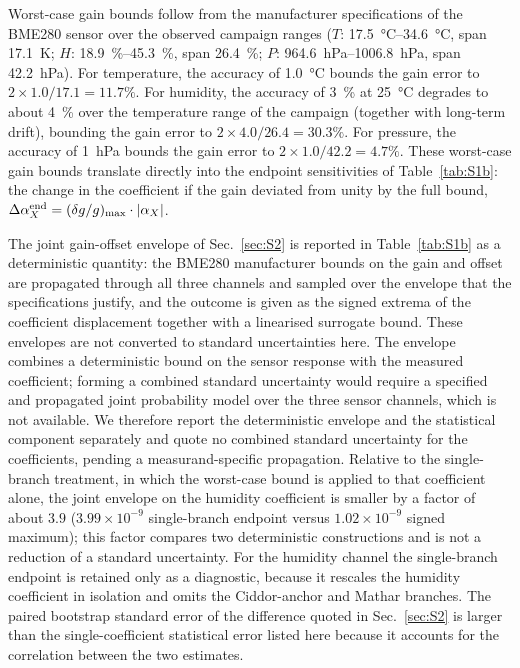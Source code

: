 \documentclass[aps,prapplied,reprint,superscriptaddress]{revtex4-2}
\begin{document}
Worst-case gain bounds follow from the manufacturer specifications of the BME280 sensor over the observed campaign ranges ($T$: \SIrange{17.5}{34.6}{\degreeCelsius}, span \SI{17.1}{\kelvin}; $H$: \SIrange{18.9}{45.3}{\percent}, span \SI{26.4}{\percent}; $P$: \SIrange{964.6}{1006.8}{\hecto\pascal}, span \SI{42.2}{\hecto\pascal}). For temperature, the accuracy of \SI{1.0}{\degreeCelsius} bounds the gain error to $2 \times 1.0/17.1 = 11.7\%$. For humidity, the accuracy of \SI{3}{\percent} at \SI{25}{\degreeCelsius} degrades to about \SI{4}{\percent} over the temperature range of the campaign (together with long-term drift), bounding the gain error to $2 \times 4.0/26.4 = 30.3\%$. For pressure, the accuracy of \SI{1}{\hecto\pascal} bounds the gain error to $2 \times 1.0/42.2 = 4.7\%$. These worst-case gain bounds translate directly into the endpoint sensitivities of Table~\ref{tab:S1b}: the change in the coefficient if the gain deviated from unity by the full bound, $\Delta\alpha_X^{\rm end} = (\delta g/g)_{\max} \cdot |\alpha_X|$.

The joint gain-offset envelope of Sec.~\ref{sec:S2} is reported in Table~\ref{tab:S1b} as a deterministic quantity: the BME280 manufacturer bounds on the gain and offset are propagated through all three channels and sampled over the envelope that the specifications justify, and the outcome is given as the signed extrema of the coefficient displacement together with a linearised surrogate bound. These envelopes are not converted to standard uncertainties here. The envelope combines a deterministic bound on the sensor response with the measured coefficient; forming a combined standard uncertainty would require a specified and propagated joint probability model over the three sensor channels, which is not available. We therefore report the deterministic envelope and the statistical component separately and quote no combined standard uncertainty for the coefficients, pending a measurand-specific propagation. Relative to the single-branch treatment, in which the worst-case bound is applied to that coefficient alone, the joint envelope on the humidity coefficient is smaller by a factor of about $3.9$ ($3.99\times10^{-9}$ single-branch endpoint versus $1.02\times10^{-9}$ signed maximum); this factor compares two deterministic constructions and is not a reduction of a standard uncertainty. For the humidity channel the single-branch endpoint is retained only as a diagnostic, because it rescales the humidity coefficient in isolation and omits the Ciddor-anchor and Mathar branches. The paired bootstrap standard error of the difference quoted in Sec.~\ref{sec:S2} is larger than the single-coefficient statistical error listed here because it accounts for the correlation between the two estimates.
\end{document}
